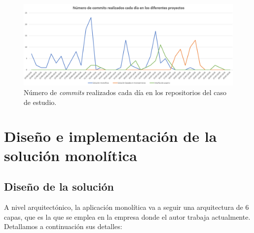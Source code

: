 \documentclass[11pt,spanish,listoffigures]{tfgetsinf}
\begin{document}
\begin{figure}[h]
\centering
\includegraphics[scale=0.5]{commits}
\caption{Número de \textit{commits} realizados cada día en los repositorios del caso de estudio.}
\end{figure}

%

\chapter{Diseño e implementación de la solución monolítica}

\section{Diseño de la solución} \label{sct:DiseñoMonolitico}

A nivel arquitectónico, la aplicación monolítica va a seguir una arquitectura de 6 capas, que es la que se emplea en la empresa donde el autor trabaja actualmente. Detallamos a continuación sus detalles:
\end{document}
